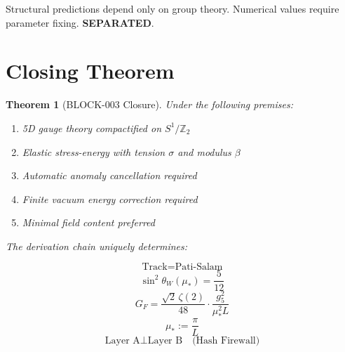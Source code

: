 \documentclass[11pt,a4paper]{article}
\newtheorem{theorem}{Theorem}[section]
\begin{document}
\begin{trapbox}
\label{trap:rt12}
Structural predictions depend only on group theory. Numerical values require parameter fixing. \textbf{SEPARATED}.
\end{trapbox}

\section{Closing Theorem}
\label{sec:closing-theorem}

\begin{theorem}[BLOCK-003 Closure]
\label{thm:block003-closure}
Under the following premises:
\begin{enumerate}[label=\textbf{P\arabic*}]
    \item \label{premise:5d} 5D gauge theory compactified on $S^1/\mathbb{Z}_2$
    \item \label{premise:elastic} Elastic stress-energy with tension $\sigma$ and modulus $\beta$
    \item \label{premise:anomaly} Automatic anomaly cancellation required
    \item \label{premise:finite} Finite vacuum energy correction required
    \item \label{premise:minimal} Minimal field content preferred
\end{enumerate}

The derivation chain uniquely determines:

\begin{closurebox}
\label{box:closing-theorem}
\begin{equation}
\label{eq:closing-1}
\boxed{\text{Track} = \text{Pati-Salam}}
\end{equation}
\begin{equation}
\label{eq:closing-2}
\boxed{\sin^2\theta_W(\mu_*) = \frac{5}{12}}
\end{equation}
\begin{equation}
\label{eq:closing-3}
\boxed{G_F = \frac{\sqrt{2}\,\zeta(2)}{48} \cdot \frac{g_5^2}{\mu_*^2 L}}
\end{equation}
\begin{equation}
\label{eq:closing-4}
\boxed{\mu_* := \frac{\pi}{L}}
\end{equation}
\begin{equation}
\label{eq:closing-5}
\boxed{\text{Layer A} \perp \text{Layer B} \quad \text{(Hash Firewall)}}
\end{equation}
\end{closurebox}
\end{theorem}
\end{document}
